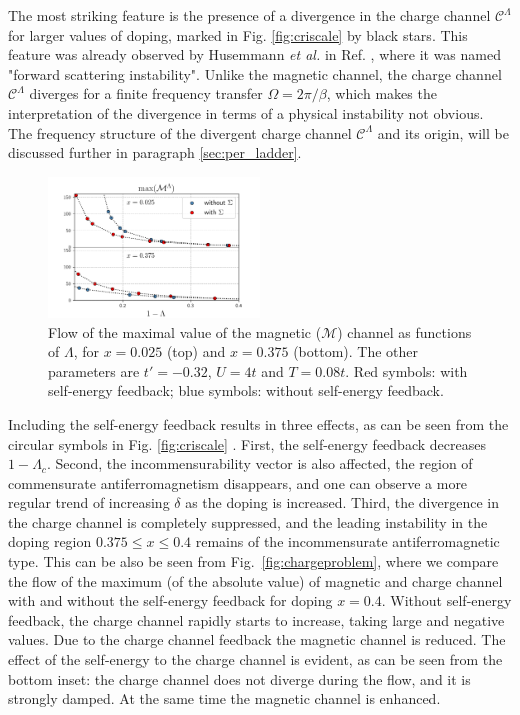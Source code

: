 The most striking feature is the presence of a divergence in the charge channel $\mathcal{C}^\Lambda$ for larger values of doping, marked in Fig. \ref{fig:criscale} by black stars. 
This feature was already observed by Husemmann \textit{et al.} in Ref. , where it was named "forward scattering instability". 
Unlike the magnetic channel, the charge channel $\mathcal{C}^\Lambda$ diverges for a finite frequency transfer $\Omega=2\pi/\beta$, which makes the interpretation of the divergence in terms of a physical instability not obvious. 
The frequency structure of the divergent charge channel $\mathcal{C}^\Lambda$ and its origin, will be discussed further in paragraph \ref{sec:per_ladder}.

\begin{figure}
\includegraphics[width=0.50\textwidth]{images/chargeproblem_M_vs_Lambda_diff_occ.png}
\caption{Flow of the maximal value of the  magnetic ($\mathcal{M}$) channel as functions of $\Lambda$, for  $x=0.025$ (top) and $x=0.375$ (bottom). The other parameters are $t'=-0.32$, $U=4t$ and $T=0.08t$. Red symbols: with self-energy feedback; blue symbols: without self-energy feedback. }
\label{fig:selfeffect}
\end{figure}

Including the self-energy feedback results in three effects, as can be seen from the circular symbols in Fig. \ref{fig:criscale} . 
First, the self-energy feedback decreases $1-\Lambda_c$.
Second, the incommensurability vector is also affected, the region of commensurate antiferromagnetism disappears, and one can observe a more regular trend of increasing $\delta$ as the doping is increased.
Third, the divergence in the charge channel is completely suppressed, and the leading instability in the doping region $0.375\le x \le 0.4$ remains of the incommensurate antiferromagnetic type. 
This can be also be seen from Fig.~\ref{fig:chargeproblem}, where we compare the flow of the maximum (of the absolute value) of magnetic and charge channel with and without the self-energy feedback for doping $x=0.4$.
Without self-energy feedback, the charge channel rapidly starts to increase, taking large and negative values.
Due to the charge channel feedback the magnetic channel is reduced.    
The effect of the self-energy to the charge channel is evident, as can be seen from the bottom inset: the charge channel does not diverge during the flow, and it is strongly damped.  
At the same time the magnetic channel is enhanced.

